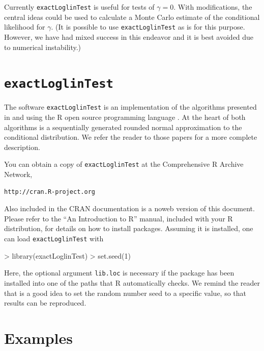 \documentclass[a4paper]{article}
\begin{document}
Currently \texttt{exactLoglinTest} is useful for tests of $\gamma = 0$. With
modifications, the central ideas could be used to calculate a Monte
Carlo estimate of the conditional likelihood for $\gamma$. (It is
possible to use \texttt{exactLoglinTest} as is for this purpose. However, we have had
mixed success in this endeavor and it is best avoided due to numerical
instability.)

\section{\texttt{exactLoglinTest}} 
The software \texttt{exactLoglinTest} is an implementation of the algorithms presented
in \cite{booth:butler:1999} and \cite{caffo:booth:2000} using the R open source
programming language \cite{ihaka:gent}.  At the heart
of both algorithms is a sequentially generated rounded normal
approximation to the conditional distribution. We refer the reader
to those papers for a more complete description.

You can obtain a copy of \texttt{exactLoglinTest} at the Comprehensive R Archive Network,
\begin{verbatim}
http://cran.R-project.org
\end{verbatim}
Also included in the CRAN documentation is a noweb version of this
document.  Please refer to the ``An Introduction to R'' manual,
included with your R distribution, for details on how to install
packages. Assuming it is installed, one can load
\texttt{exactLoglinTest} with
\begin{Schunk}
\begin{Sinput}
> library(exactLoglinTest)
> set.seed(1)
\end{Sinput}
\end{Schunk}
Here, the optional argument \texttt{lib.loc} is necessary if the
package has been installed into one of the paths that R automatically
checks. We remind the reader that is a good idea to set the random
number seed to a specific value, so that results can be reproduced.

\section{Examples}
\end{document}

